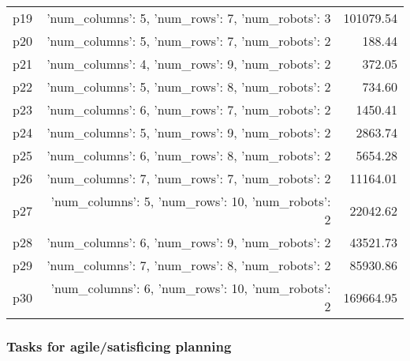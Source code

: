 \documentclass{article}
\begin{document}
\begin{center}
\begin{tabular}{@{}l|r|r@{}}
  p19&{'num\_columns': 5, 'num\_rows': 7, 'num\_robots': 3}&101079.54\\
  p20&{'num\_columns': 5, 'num\_rows': 7, 'num\_robots': 2}&188.44\\
  p21&{'num\_columns': 4, 'num\_rows': 9, 'num\_robots': 2}&372.05\\
  p22&{'num\_columns': 5, 'num\_rows': 8, 'num\_robots': 2}&734.60\\
  p23&{'num\_columns': 6, 'num\_rows': 7, 'num\_robots': 2}&1450.41\\
  p24&{'num\_columns': 5, 'num\_rows': 9, 'num\_robots': 2}&2863.74\\
  p25&{'num\_columns': 6, 'num\_rows': 8, 'num\_robots': 2}&5654.28\\
  p26&{'num\_columns': 7, 'num\_rows': 7, 'num\_robots': 2}&11164.01\\
  p27&{'num\_columns': 5, 'num\_rows': 10, 'num\_robots': 2}&22042.62\\
  p28&{'num\_columns': 6, 'num\_rows': 9, 'num\_robots': 2}&43521.73\\
  p29&{'num\_columns': 7, 'num\_rows': 8, 'num\_robots': 2}&85930.86\\
  p30&{'num\_columns': 6, 'num\_rows': 10, 'num\_robots': 2}&169664.95
                            \end{tabular}
                            \end{center}
                    

                                \subsubsection*{Tasks for agile/satisficing planning}
                                
\end{document}
